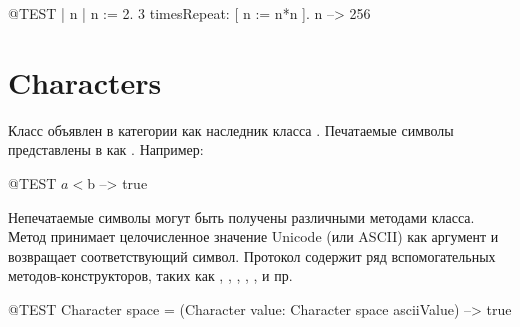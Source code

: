 \documentclass[a4paper,10pt,twoside]{book}
\begin{document}
\begin{code}{@TEST | n |}
n := 2.
3 timesRepeat: [ n := n*n ].
n --> 256
\end{code}

\section{Characters}

Класс  объявлен в категории  как наследник класса . Печатаемые символы представлены в \pharo как .  Например:


\begin{code}{@TEST}
$a < $b --> true
\end{code}

Непечатаемые символы могут быть получены различными методами класса. Метод \mbox{} принимает целочисленное значение Unicode (или ASCII) как аргумент и возвращает соответствующий символ. Протокол  содержит ряд вспомогательных методов-конструкторов, таких как , , , , ,  и пр.

\begin{code}{@TEST}
Character space = (Character value: Character space asciiValue) --> true
\end{code}
\end{document}
